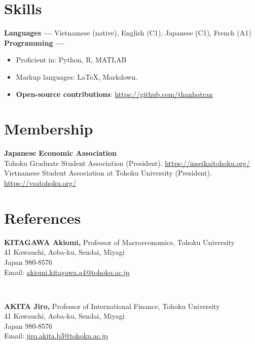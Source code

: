 \documentclass[margin,line]{res}
\begin{document}
\begin{resume}
\vspace{4mm}

\section{\sc Skills}
{\bf Languages ---}
\vspace*{.05in}
Vietnamese (native), English (C1), Japanese (C1), French (A1)\\
{\bf Programming ---}
\vspace*{.05in}
\begin{itemize}
	\item Proficient in: Python, R, MATLAB
	\item Markup languages: \LaTeX, Markdown.
	\item {\bf Open-source contributions}: \url{https://github.com/thanhqtran}
\end{itemize}

\vspace{4mm}

\section{\sc Membership}
{\bf Japanese Economic Association} \\
Tohoku Graduate Student Association (President). \url{https://inseikaitohoku.org/} \\
Vietnamese Student Association at Tohoku University (President). \url{https://vsatohoku.org/}








\section{\sc References}
\vspace*{.05in}
\parbox{\textwidth}{
{\bf KITAGAWA Akiomi,} Professor of Macroeconomics, Tohoku University \\
41 Kawauchi, Aoba-ku, Sendai, Miyagi \\
Japan 980-8576 \\
Email: \href{mailto:akiomi.kitagawa.a4@tohoku.ac.jp}{akiomi.kitagawa.a4@tohoku.ac.jp}} \\

\par
\parbox{\textwidth}{
{\bf AKITA Jiro,} Professor of International Finance, Tohoku University\\
41 Kawauchi, Aoba-ku, Sendai, Miyagi \\
Japan 980-8576 \\
Email: \href{mailto:jiro.akita.b3@tohoku.ac.jp}{jiro.akita.b3@tohoku.ac.jp}}


\end{resume}
\end{document}
